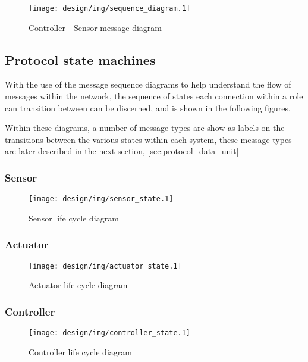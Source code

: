 \begin{figure}[h!]
\centering
\texttt{[image: design/img/sequence\_diagram.1]}
\caption{Controller - Sensor message diagram}
\label{fig:sequence_diagram}
\end{figure}



\newpage
\subsection{Protocol state machines} %
\label{sub:states}
With the use of the message sequence diagrams to help understand the flow of messages within the network, the sequence of states each connection within a role can transition between can be discerned, and is shown in the following figures.

Within these diagrams, a number of message types are show as labels on the transitions between the various states within each system, these message types are later described in the next section, \ref{sec:protocol_data_unit}

\subsubsection{Sensor} %
\label{ssub:sensor}
\begin{figure}[h!]
\centering
\texttt{[image: design/img/sensor\_state.1]}
\caption{Sensor life cycle diagram}
\label{fig:sensorstate}
\end{figure}


\subsubsection{Actuator} %
\label{ssub:actuator}
\begin{figure}[h!]
\centering
\texttt{[image: design/img/actuator\_state.1]}
\caption{Actuator life cycle diagram}
\label{fig:actuatorstate}
\end{figure}

\subsubsection{Controller} %
\label{ssub:controller}
\begin{figure}[h!]
\centering
\texttt{[image: design/img/controller\_state.1]}
\caption{Controller life cycle diagram}
\label{fig:controllerstate}
\end{figure}


